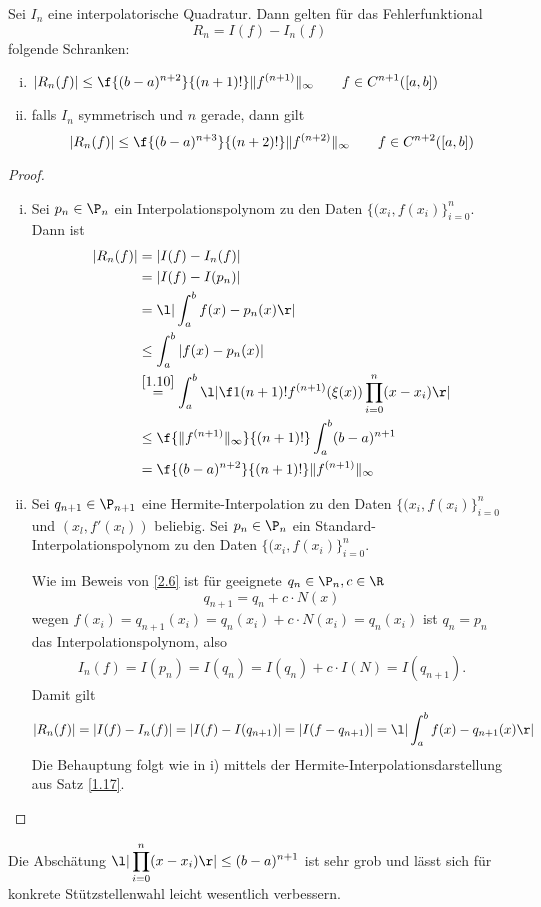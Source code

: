 \documentclass[11pt]{scrbook}
\begin{document}
\begin{st}
	\label{2.7}
	Sei $I_n$ eine interpolatorische Quadratur.
	Dann gelten für das Fehlerfunktional
	\[
		R_n = I(f) - I_n(f)
	\]
	folgende Schranken:
	\begin{enumerate}[i)]
		\item
			$\displaystyle |R_n(f)| \le \f {(b-a)^{n+2}}{(n+1)!}\|f^{(n+1)}\|_\infty \qquad f\in C^{n+1}([a,b])$
		\item
			falls $I_n$ symmetrisch und $n$ gerade, dann gilt
			\[
				|R_n(f)| \le \f {(b-a)^{n+3}}{(n+2)!} \|f^{(n+2)}\|_\infty \qquad f\in C^{n+2}([a,b])
			\]
	\end{enumerate}
	\begin{proof}
		\begin{enumerate}[i)]
			\item
				Sei $p_n\in \P_n$ ein Interpolationspolynom zu den Daten $\{(x_i,f(x_i)\}_{i=0}^n$.
				Dann ist
				\begin{align*}
					|R_n(f)| 
					&= |I(f) - I_n(f)| \\
					&= |I(f) - I(p_n)| \\
					&= \l|\int_a^b f(x) - p_n(x) \r| \\
					&\le \int_a^b |f(x)-p_n(x)| \\
					&\stackrel{\ref{1.10}}= \int_a^b \l| \f 1{(n+1)!}f^{(n+1)}(\xi(x)) \prod_{i=0}^n (x-x_i)\r| \\
					&\le \f {\|f^{(n+1)}\|_\infty}{(n+1)!} \int_a^b (b-a)^{n+1} \\
					&= \f {(b-a)^{n+2}}{(n+1)!}\|f^{(n+1)}\|_\infty
				\end{align*}
			\item
				Sei $q_{n+1}\in \P_{n+1}$ eine Hermite-Interpolation zu den Daten $\{(x_i,f(x_i)\}_{i=0}^n$ und $(x_l,f'(x_l))$ beliebig.
				Sei $p_n\in \P_n$ ein Standard-Interpolationspolynom zu den Daten $\{(x_i,f(x_i)\}_{i=0}^n$.

				Wie im Beweis von \ref{2.6}	ist für geeignete $q_n\in \P_n, c\in \R$ 
				\[
					q_{n+1} = q_n + c\cdot N(x)
				\]
				wegen $f(x_i) = q_{n+1}(x_i) = q_n(x_i) + c\cdot N(x_i) = q_n(x_i)$ ist $q_n = p_n$ das Interpolationspolynom, also
				\begin{align*}
					I_n(f)
					= I(p_n)
					= I(q_n)
					= I(q_n) + c\cdot I(N)
					= I(q_{n+1}).
				\end{align*}
				Damit gilt
				\[
					|R_n(f)| 
					= |I(f) - I_n(f)| 
					= |I(f) - I(q_{n+1})|
					= |I(f-q_{n+1})|
					= \l| \int_a^b f(x) - q_{n+1}(x) \r|
				\]
				Die Behauptung folgt wie in i) mittels der Hermite-Interpolationsdarstellung aus Satz \ref{1.17}.
		\end{enumerate}
	\end{proof}
	\begin{note}
		Die Abschätung $\displaystyle \l| \prod_{i=0}^n (x-x_i) \r| \le (b-a)^{n+1}$ ist sehr grob und lässt sich für konkrete Stützstellenwahl leicht wesentlich verbessern.
	\end{note}
\end{st}
\end{document}
